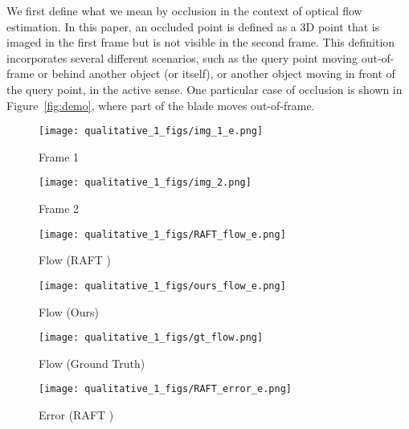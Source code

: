 \documentclass[10pt,twocolumn,letterpaper]{article}
\begin{document}
We first define what we mean by occlusion in the context of optical flow estimation.
In this paper, an occluded point is defined as a 3D point that is imaged in the first
frame but is not visible in the second frame. This definition incorporates several
different scenarios, such as the query point moving out-of-frame or behind another
object (or itself), or another object moving in front of the query point, in the
active sense. One particular case of occlusion is shown in Figure~\ref{fig:demo},
where part of the blade moves out-of-frame.

\begin{figure*}[t!]
     \centering
     \begin{subfigure}[b]{0.141\textwidth}
         \centering
         \caption*{Frame 1}
         \texttt{[image: qualitative\_1\_figs/img\_1\_e.png]}
     \end{subfigure}\hfill
     \begin{subfigure}[b]{0.141\textwidth}
         \centering
         \caption*{Frame 2}
         \texttt{[image: qualitative\_1\_figs/img\_2.png]}
     \end{subfigure}\hfill
     \begin{subfigure}[b]{0.141\textwidth}
         \centering
         \caption*{Flow (RAFT \cite{raft})}
         \texttt{[image: qualitative\_1\_figs/RAFT\_flow\_e.png]}
     \end{subfigure}\hfill
     \begin{subfigure}[b]{0.141\textwidth}
         \centering
         \caption*{Flow (Ours)}
         \texttt{[image: qualitative\_1\_figs/ours\_flow\_e.png]}
     \end{subfigure}\hfill
     \begin{subfigure}[b]{0.141\textwidth}
         \centering
         \caption*{Flow (Ground Truth)}
         \texttt{[image: qualitative\_1\_figs/gt\_flow.png]}
     \end{subfigure}\hfill
     \begin{subfigure}[b]{0.141\textwidth}
         \centering
         \caption*{Error (RAFT \cite{raft})}
         \texttt{[image: qualitative\_1\_figs/RAFT\_error\_e.png]}
     \end{subfigure}\hfill
     \begin{subfigure}[b]{0.141\textwidth}
         \centering

\end{subfigure}
\end{figure*}
\end{document}
